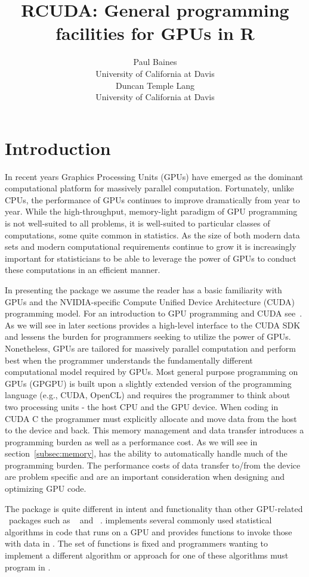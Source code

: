 \documentclass[article]{jss}
\author{Paul Baines\\University of California at Davis\\
        Duncan Temple Lang\\University of California at Davis}
\title{RCUDA: General programming facilities for GPUs in R}
\def\C{\proglang{C}}
\def\R{\proglang{R}}
\def\Rpkg#1{\pkg{#1}}
\begin{document}
\section{Introduction}\label{sec:Introduction}
In recent years Graphics Processing Units (GPUs) have emerged as the 
dominant computational platform for massively  parallel computation. 
Fortunately, unlike CPUs, the performance of GPUs continues to improve
dramatically from year to year. While the high-throughput, memory-light
paradigm of GPU programming is not well-suited to all problems, it is
well-suited to particular classes of computations, some quite common in
statistics. As the size of both modern data sets and modern computational
requirements continue to grow it is increasingly important for statisticians
to be able to leverage the power of GPUs to conduct these computations in 
an efficient manner.


In presenting the  package we assume the reader has a basic
familiarity with GPUs and the NVIDIA-specific Compute Unified Device
Architecture (CUDA) programming model. For an introduction to GPU
programming and CUDA see~\cite{bib:pmpp}. As we will see in later sections
 provides a high-level interface to the CUDA SDK and lessens
the burden for \R{} programmers seeking to utilize the power of GPUs.
Nonetheless, GPUs are tailored for massively parallel computation and
perform best when the programmer understands the fundamentally different
computational model required by GPUs.
Most general purpose programming on GPUs (GPGPU) is built upon a slightly extended
version of the  \C{}  programming language (e.g., CUDA, OpenCL) and requires
the programmer to think about two processing units - the host CPU
and the GPU device. When coding in CUDA C the programmer must explicitly 
allocate and move data from the host to the device and back. This memory 
management and data transfer introduces a programming burden as well as a 
performance cost. As we will see in section~\ref{subsec:memory},  
has the ability to automatically handle much of the programming burden. 
The performance costs of data transfer to/from the device are problem specific
and are an important consideration when designing and optimizing GPU code.

The  package is quite different in intent and functionality
than other GPU-related \R\, packages such as
\Rpkg{gputools}~\citep{bib:gputools} and \Rpkg{rgpu}~\citep{bib:rgpu}.
\Rpkg{gputools} implements several commonly used statistical
algorithms in \C{} code that runs on a GPU and provides \R{} functions
to invoke those with data in \R.  The set of functions is fixed and
\R{} programmers wanting to implement a different algorithm or
approach for one of these algorithms must program in \C.
\end{document}
